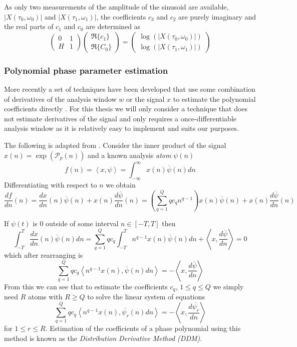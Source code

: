 \documentclass[letterpaper,12pt]{report}
\begin{document}
As only two measurements of the amplitude of the sinusoid are available,
$|X(\tau_0,\omega_0)|$ and $|X(\tau_1,\omega_1)|$, the coefficients
$c_3$ and $c_2$ are purely imaginary and the real parts of $c_1$ and $c_0$ are
determined as
\begin{equation}
    \begin{pmatrix}
        0 & 1 \\
        H & 1
    \end{pmatrix}
    \begin{pmatrix}
        \Re\{c_1\} \\
        \Re\{C_0\}
    \end{pmatrix}
    =
    \begin{pmatrix}
        \log(|X(\tau_0,\omega_0)|) \\
        \log(|X(\tau_1,\omega_1)|)
    \end{pmatrix}
\end{equation}

\subsubsection{Polynomial phase parameter estimation}

More recently a set of techniques have been developed that use some combination
of derivatives of the analysis window $w$ or the signal $x$ to estimate the
polynomial coefficients directly \cite{hamilton2011non}. For this thesis we will
only consider a technique that does not estimate derivatives of the signal and
only requires a once-differentiable analysis window as it is relatively easy to
implement and suits our purposes.

The following is adapted from \cite{betser2009sinusoidal}. Consider the inner
product of the signal $x(n) = \exp(\mathcal{P}_p(n)) $ and a
known analysis \textit{atom} $\psi(n)$
\[
    f(n) = \left\langle x,\psi \right\rangle =
    \int_{-\infty}^{\infty}x(n)\overline{\psi}(n)dn
\]
Differentiating with respect to $n$ we obtain
\[
    \frac{df}{dn}(n) = \frac{dx}{dn}(n)\overline{\psi}(n)
    + x(n)\frac{d\overline{\psi}}{dn}(n)
    = \left( \sum_{q=1}^{Q} q c_q n^{q-1} \right) x(n)\overline{\psi}(n)
    + x(n)\frac{d\overline{\psi}}{dn}(n)
\]

If $\psi(t)$ is 0 outside of some interval $n \in [-T,T]$ then
\[
    \int_{-T}^{T} \frac{dx}{dn}(n)\overline{\psi}(n) dn
    = \sum_{q=1}^{Q} q c_q \int_{-T}^{T} n^{q-1} x(n) \overline{\psi}(n) dn
    + \left\langle x, \frac{d\overline{\psi}}{dn} \right\rangle = 0
\]
which after rearranging is
\[ 
    \sum_{q=1}^{Q} q c_q 
    \left\langle n^{q-1} x(n) , \overline{\psi}(n) dn \right\rangle
    = -\left\langle x, \frac{d\overline{\psi}}{dn} \right\rangle
\]
From this we can see that to estimate the coefficients $c_q$, $ 1 \leq q \leq Q
$ we simply need $R$ atoms with $R \geq Q$ to solve the linear system of
equations
\[ 
    \sum_{q=1}^{Q} q c_q 
    \left\langle n^{q-1} x(n) , \overline{\psi_{r}}(n) dn \right\rangle
    = -\left\langle x, \frac{d\overline{\psi_{r}}}{dn} \right\rangle
\]
for $1 \leq r \leq R$. Estimation of the coefficients of a phase polynomial
using this method is known as the \textit{Distribution Derivative Method (DDM)}.
\end{document}
